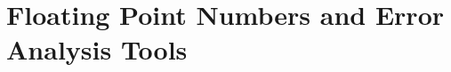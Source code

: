 \documentclass{article}
\newcommand{\R}{\mathbb{R}}
\newcommand{\F}{\mathbb{F}}
\newcommand{\dd}{\delta}
\newcommand{\fl}{\mathrm{fl}}
\theoremstyle{definition}
\begin{document}
\section{Floating Point Numbers and Error Analysis Tools}
%
%
%
%
\end{document}
